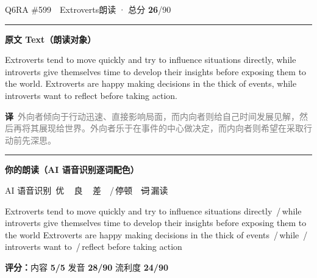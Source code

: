 \documentclass[11pt]{article}
\newcommand{\sfull}[1]{\textcolor{cFix}{\bfseries #1}}     %
\newcommand{\spart}[1]{\textcolor{cPartial}{\bfseries #1}} %
\newcommand{\ptesub}[1]{%
  \par\needspace{2\baselineskip}\smallskip
  {\color{cAccent}\rule[-0.2ex]{3pt}{1.05em}}\hspace{6pt}%
  {\bfseries\color{cHead}#1}\par\nopagebreak\smallskip}
\newcommand{\sg}[1]{\textcolor{cSpkGood}{#1}}   %
\newcommand{\sy}[1]{\textcolor{cSpkOk}{#1}}     %
\newcommand{\sr}[1]{\textcolor{cSpkBad}{#1}}    %
\newcommand{\pse}{{\color{gray}\,/\,}}          %
\newcommand{\asrlegend}{{\footnotesize\color{gray}AI 语音识别\quad
  {\color{cSpkGood}\textbullet}\,优\ \ {\color{cSpkOk}\textbullet}\,良\ \
  {\color{cSpkBad}\textbullet}\,差\ \ {\color{gray}/}\,停顿\ \
  {\color{cSpkBad}\sout{词}}\,漏读}}
\newcommand{\zh}[1]{{\footnotesize\textcolor{cNote}{\textbf{译}}\ \textcolor{gray}{#1}}}
\begin{document}
\begin{qblock}{Q6\quad RA \#599\ \ Extroverts}{朗读 · 总分 \textcolor{cAccent}{\bfseries 26}/90}
\ptesub{原文 Text（朗读对象）}
\begin{promptbox}
Extroverts tend to move quickly and try to influence situations directly, while introverts give themselves time to develop their insights before exposing them to the world. Extroverts are happy making decisions in the thick of events, while introverts want to reflect before taking action.
\end{promptbox}
\zh{外向者倾向于行动迅速、直接影响局面，而内向者则给自己时间发展见解，然后再将其展现给世界。外向者乐于在事件的中心做决定，而内向者则希望在采取行动前先深思。}
\ptesub{你的朗读（AI 语音识别逐词配色）}
\asrlegend
\begin{asrbox}
\sr{Extroverts} \sg{tend} \sg{to} \sg{move} \sg{quickly} \sg{and} \sg{try} \sg{to} \sg{influence} \sg{situations} \sg{directly} \pse \sr{while} \sg{introverts} \sg{give} \sg{themselves} \sy{time} \sg{to} \sg{develop} \sg{their} \sg{insights} \sg{before} \sy{exposing} \sg{them} \sg{to} \sg{the} \sg{world} \sr{Extroverts} \sg{are} \sg{happy} \sg{making} \sy{decisions} \sg{in} \sg{the} \sg{thick} \sg{of} \sy{events} \pse \sg{while} \pse \sy{introverts} \sg{want} \sg{to} \pse \sg{reflect} \sg{before} \sg{taking} \sg{action}
\end{asrbox}
\smallskip
{\small\textbf{评分：}内容 \sfull{5/5} \quad\textperiodcentered\quad 发音 \spart{28/90} \quad\textperiodcentered\quad 流利度 \spart{24/90}}\quad{\footnotesize\color{gray}（用时 01:06）}
\end{qblock}
\end{document}
